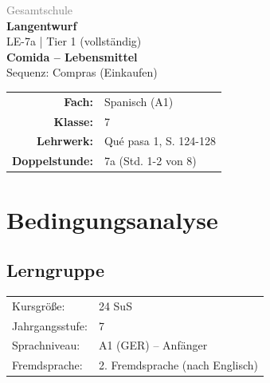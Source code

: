 \documentclass[11pt,a4paper]{article}
\newcommand{\fach}{Spanisch}
\newcommand{\jahrgangsstufe}{7}
\newcommand{\schulart}{Gesamtschule}
\newcommand{\stundenthema}{Comida -- Lebensmittel}
\newcommand{\reihenthema}{Compras (Einkaufen)}
\newcommand{\stundennummer}{7a}
\newcommand{\gerniveau}{A1}
\newcommand{\lehrwerk}{Qué pasa 1}
\newcommand{\lehrwerkseite}{S. 124-128}
\newcommand{\lerngruppengroesse}{24}
\begin{document}
\begin{titlepage}
    \centering
    \vspace*{2cm}
    {\large\textcolor{gray}{\schulart}}\\[2cm]
    {\Huge\textcolor{fach}{\textbf{Langentwurf}}}\\[0.5cm]
    {\large LE-\stundennummer{} | Tier 1 (vollständig)}\\[2cm]
    {\LARGE\textbf{\stundenthema}}\\[0.5cm]
    {\large Sequenz: \reihenthema}\\[2cm]
    \begin{tabular}{rl}
        \textbf{Fach:} & \fach{} (\gerniveau) \\[0.3cm]
        \textbf{Klasse:} & \jahrgangsstufe \\[0.3cm]
        \textbf{Lehrwerk:} & \lehrwerk, \lehrwerkseite \\[0.3cm]
        \textbf{Doppelstunde:} & \stundennummer{} (Std. 1-2 von 8) \\[0.3cm]
    \end{tabular}
    \vfill
\end{titlepage}

\tableofcontents
\newpage

\section{Bedingungsanalyse}

\subsection{Lerngruppe}
\begin{tabular}{ll}
    Kursgröße: & \lerngruppengroesse{} SuS \\
    Jahrgangsstufe: & \jahrgangsstufe \\
    Sprachniveau: & \gerniveau{} (GER) -- Anfänger \\
    Fremdsprache: & 2. Fremdsprache (nach Englisch) \\
\end{tabular}
\end{document}
